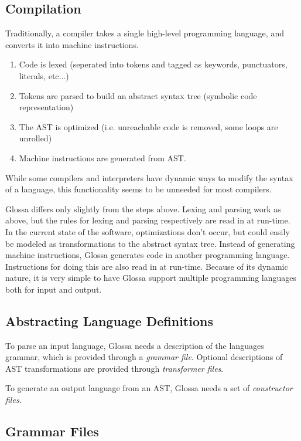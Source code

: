 \documentclass{article}
\begin{document}
\subsection{Compilation}
Traditionally, a compiler takes a single high-level programming language, and converts it into machine instructions.
\begin{enumerate}
\item Code is lexed (seperated into tokens and tagged as keywords, punctuators, literals, etc...)
\item Tokens are parsed to build an abstract syntax tree (symbolic code representation)
\item The AST is optimized (i.e. unreachable code is removed, some loops are unrolled)
\item Machine instructions are generated from AST.
\end{enumerate}
While some compilers and interpreters have dynamic ways to modify the syntax of a language, this functionality seems to be unneeded for most compilers.

Glossa differs only slightly from the steps above. Lexing and parsing work as above, but the rules for lexing and parsing respectively are read in at run-time. 
In the current state of the software, optimizations don't occur, but could easily be modeled as transformations to the abstract syntax tree.
Instead of generating machine instructions, Glossa generates code in another programming language. 
Instructions for doing this are also read in at run-time.
Because of its dynamic nature, it is very simple to have Glossa support multiple programming languages both for input and output.

\subsection{Abstracting Language Definitions}

To parse an input language, Glossa needs a description of the languages grammar, which is provided through a \textit{grammar file}.
Optional descriptions of AST transformations are provided through \textit{transformer files}.

To generate an output language from an AST, Glossa needs a set of \textit{constructor files}.

\subsection{Grammar Files}
\end{document}
